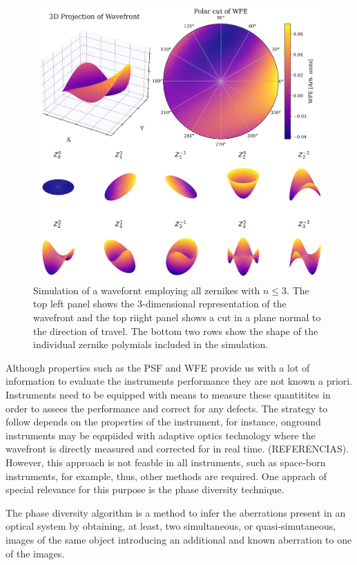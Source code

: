 \begin{figure}
  \centering
  \includegraphics[width = \textwidth]{figures/Introduction/zernikes_combined.pdf}
  \caption{Simulation of a wavefornt employing all zernikes with $n \leqslant 3$. The top left panel shows the 3-dimensional representation of the wavefront and the top riight panel shows a cut in a plane normal to the direction of travel. The bottom two rows show the shape of the individual zernike polymials included in the simulation.} 
  \label{fig_intro: zernikes}
\end{figure}

Although properties such as the PSF and WFE provide us with a lot of information to evaluate the instruments performance they are not known a priori. Instruments need to be equipped with means to measure these quantitites in order to assees the performance and correct for any defects. The strategy to follow depends on the properties of the instrument, for instance, onground instruments may be equpiided with adaptive optics technology where the wavefront is directly measured and corrected for in real time. (REFERENCIAS). However, this approach is not feasble in all instruments, such as space-born instruments, for example, thus, other methods are required. One apprach  of special relevance for this purpose is the phase diversity technique.

The phase diversity algorithm \citep{PD_original} is a method to infer the aberrations present in an optical system by obtaining, at least, two simultaneous, or quasi-simutaneous, images of the same object introducing an additional and known aberration to one of the images.  

